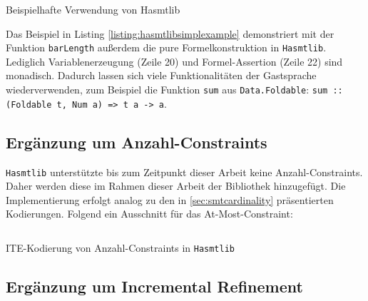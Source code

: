 \begin{listing}[H]
    \inputminted[linenos=true]{haskell}{Code/Implementierung/Hasmtlib/BeispielSimple.hs}
    \caption{Beispielhafte Verwendung von Hasmtlib}
    \label{listing:hasmtlibsimplexample}
\end{listing}

Das Beispiel in Listing \ref{listing:hasmtlibsimplexample} demonstriert mit der Funktion \texttt{barLength} außerdem die pure Formelkonstruktion in \texttt{Hasmtlib}.
Lediglich Variablenerzeugung (Zeile 20) und Formel-Assertion (Zeile 22) sind monadisch.
Dadurch lassen sich viele Funktionalitäten der Gastsprache wiederverwenden, zum Beispiel die Funktion \texttt{sum} aus \texttt{Data.Foldable}:
\texttt{sum :: (Foldable t, Num a) => t a -> a}.

\subsection{Ergänzung um Anzahl-Constraints}
\label{subsec:implCardinality}
\texttt{Hasmtlib} unterstützte bis zum Zeitpunkt dieser Arbeit keine Anzahl-Constraints.
Daher werden diese im Rahmen dieser Arbeit der Bibliothek hinzugefügt.
Die Implementierung erfolgt analog zu den in \ref{sec:smtcardinality} präsentierten Kodierungen.
Folgend ein Ausschnitt für das At-Most-Constraint:

\begin{listing}[H]
    \inputminted[linenos=true]{haskell}{Code/Implementierung/Hasmtlib/Cardinality.hs}
    \caption{ITE-Kodierung von Anzahl-Constraints in \texttt{Hasmtlib} \cite{hasmtlibCardinality}}
    \label{listing:hasmtlibcardinality}
\end{listing}

\subsection{Ergänzung um Incremental Refinement}
